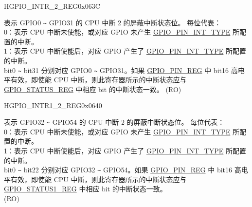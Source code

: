 \begin{register}{H}{GPIO\_INTR\_2\_REG}{0x063C}\label{regdesc:GPIOINTR2REG}
%
\regnewline%
\begin{regdesc}\begin{reglist}
\label{fielddesc:GPIOINT2}\item [GPIO\_INT\_2] 表示 GPIO0 \verb+~+ GPIO31 的 CPU 中断 2 的屏蔽中断状态位。 每位代表：\\
 0：表示 CPU 中断未使能，或对应 GPIO 未产生  \hyperref[fielddesc:GPIOPINNINTTYPE]{GPIO\_PIN\_INT\_TYPE} 所配置的中断。\\
1：表示 CPU 中断使能后，对应 GPIO 产生了  \hyperref[fielddesc:GPIOPINNINTTYPE]{GPIO\_PIN\_INT\_TYPE} 所配置的中断。\\
bit0 \verb+~+ bit31 分别对应 GPIO0 \verb+~+ GPIO31。如果  \hyperref[regdesc:GPIOPINNREG]{GPIO\_PIN\_REG} 中 bit16 高电平有效，即使能 CPU 中断，则此寄存器所示的中断状态应与 \hyperref[regdesc:GPIOSTATUSREG]{GPIO\_STATUS\_REG} 中相应 bit 的中断状态一致。
(RO)
\end{reglist}\end{regdesc}
\end{register}


\begin{register}{H}{GPIO\_INTR1\_2\_REG}{0x0640}\label{regdesc:GPIOINTR12REG}
%
%
\regnewline%
\begin{regdesc}\begin{reglist}
\label{fielddesc:GPIOINT12}\item [GPIO\_INT1\_2] 表示 GPIO32 \verb+~+ GPIO54 的 CPU 中断 2 的屏蔽中断状态位。 每位代表：\\
 0：表示 CPU 中断未使能，或对应 GPIO 未产生  \hyperref[fielddesc:GPIOPINNINTTYPE]{GPIO\_PIN\_INT\_TYPE} 所配置的中断。\\
1：表示 CPU 中断使能后，对应 GPIO 产生了  \hyperref[fielddesc:GPIOPINNINTTYPE]{GPIO\_PIN\_INT\_TYPE} 所配置的中断。\\
bit0 \verb+~+ bit22 分别对应 GPIO32 \verb+~+ GPIO54。如果  \hyperref[regdesc:GPIOPINNREG]{GPIO\_PIN\_REG} 中 bit16 高电平有效，即使能 CPU 中断，则此寄存器所示的中断状态应与  \hyperref[regdesc:GPIOSTATUS1REG]{GPIO\_STATUS1\_REG} 中相应 bit 的中断状态一致。\\
(RO)
\end{reglist}\end{regdesc}
\end{register}


